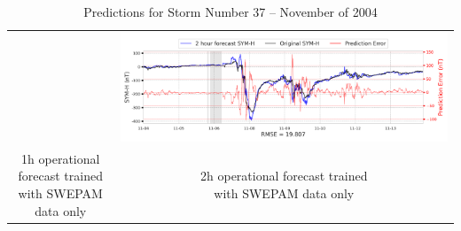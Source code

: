 \documentclass[draft,sw]{agutexSI2019}
\begin{document}
\begin{table}
\begin{tabular}{cc}
&
\includegraphics[width=0.49\linewidth]{paper_plots_shade/2h_swepam_rt/2h_swepam_rt_storm_37.png}
\\
\shortstack{1h operational forecast trained\\ with SWEPAM data only} & \shortstack{2h operational forecast trained\\ with SWEPAM data only}
\vspace*{12pt}
\\
\end{tabular}
\caption{Predictions for Storm Number 37 -- November of 2004}
\label{storm-37}
\end{table}
\end{document}
